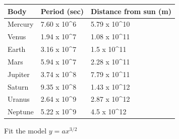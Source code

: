 \documentclass[]{article}
\begin{document}
\begin{table}[!htbp]
\centering
\label{my-label}
\begin{tabular}{|l|l|l|}
\hline
Body    & Period (sec)                & Distance from sun (m)        \\ \hline
Mercury & 7.60 x 10\textasciicircum 6 & 5.79 x 10\textasciicircum 10 \\ \hline
Venus   & 1.94 x 10\textasciicircum 7 & 1.08 x 10\textasciicircum 11 \\ \hline
Earth   & 3.16 x 10\textasciicircum 7 & 1.5 x 10\textasciicircum 11  \\ \hline
Mars    & 5.94 x 10\textasciicircum 7 & 2.28 x 10\textasciicircum 11 \\ \hline
Jupiter & 3.74 x 10\textasciicircum 8 & 7.79 x 10\textasciicircum 11 \\ \hline
Saturn  & 9.35 x 10\textasciicircum 8 & 1.43 x 10\textasciicircum 12 \\ \hline
Uranus  & 2.64 x 10\textasciicircum 9 & 2.87 x 10\textasciicircum 12 \\ \hline
Neptune & 5.22 x 10\textasciicircum 9 & 4.5 x 10\textasciicircum 12  \\ \hline
\end{tabular}
\end{table}

Fit the model \(y = ax^{3/2}\)
\end{document}
